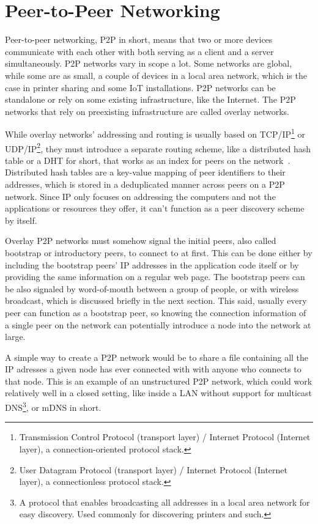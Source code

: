 \section{Peer-to-Peer Networking}
Peer-to-peer networking, P2P in short, means that two or more devices communicate with each other with both serving as a client and a server simultaneously. P2P networks vary in scope a lot. Some networks are global, while some are as small, a couple of devices in a local area network, which is the case in printer sharing and some IoT installations. P2P networks can be standalone or rely on some existing infrastructure, like the Internet. The P2P networks that rely on preexisting infrastructure are called overlay networks.

While overlay networks' addressing and routing is usually based on TCP/IP\footnote{Transmission Control Protocol (transport layer) / Internet Protocol (Internet layer), a connection-oriented protocol stack.} or UDP/IP\footnote{User Datagram Protocol (transport layer) / Internet Protocol (Internet layer), a connectionless protocol stack.}, they must introduce a separate routing scheme, like a distributed hash table or a DHT for short, that works as an index for peers on the network~\cite{Binzenhofer2007-dv}. Distributed hash tables are a key-value mapping of peer identifiers to their addresses, which is stored in a deduplicated manner across peers on a P2P network. Since IP only focuses on addressing the computers and not the applications or resources they offer, it can't function as a peer discovery scheme by itself.

Overlay P2P networks must somehow signal the initial peers, also called bootstrap or introductory peers, to connect to at first. This can be done either by including the bootstrap peers' IP addresses in the application code itself or by providing the same information on a regular web page. The bootstrap peers can be also signaled by word-of-mouth between a group of people, or with wireless broadcast, which is discussed briefly in the next section. This said, usually every peer can function as a bootstrap peer, so knowing the connection information of a single peer on the network can potentially introduce a node into the network at large.

A simple way to create a P2P network would be to share a file containing all the IP adresses a given node has ever connected with with anyone who connects to that node. This is an example of an unstructured P2P network, which could work relatively well in a closed setting, like inside a LAN without support for multicast DNS\footnote{A protocol that enables broadcasting all addresses in a local area network for easy discovery. Used commonly for discovering printers and such.}, or mDNS in short.

